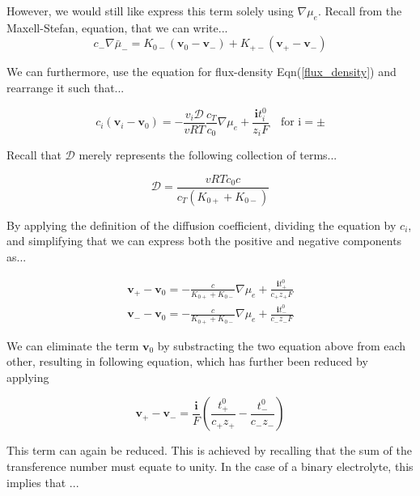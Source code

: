 \documentclass[lettersize,journal]{IEEEtran}
\begin{document}
\noindent However, we would still like express this term solely using $\nabla \mu_{e}$. Recall from the Maxell-Stefan, equation, that we can write...
\begin{equation}\label{max_n_stefy}
c_{-} \nabla \bar{\mu}_{-}=K_{0-}\left(\mathbf{v}_{0}-\mathbf{v}_{-}\right)+K_{+-}\left(\mathbf{v}_{+}-\mathbf{v}_{-}\right)
\end{equation}

We can furthermore, use the equation for flux-density Eqn(\ref{flux_density}) and rearrange it such that...

\begin{equation}\label{flux_density}
c_{i}\left(\mathbf{v}_{i}-\mathbf{v}_{0}\right) =-\frac{v_{i} \mathscr{D}}{v R T} \frac{c_{T}}{c_{0}} \nabla \mu_{e}+\frac{\mathbf{i} t_{i}^{0}}{z_{i} F} \quad \text{for i} = \pm
\end{equation}

\noindent Recall that $\mathscr{D}$ merely represents the following collection of terms...

\begin{equation}
\mathscr{D}=\frac{v R T c_{0} c}{c_{T}\left(K_{0+}+K_{0-}\right)}
\end{equation}

\noindent By applying the definition of the diffusion coefficient, dividing the equation by $c_i$, and simplifying that we can express both the positive and negative components as...

\begin{equation}\label{rel_v_pos_n_neg}
\begin{array}{l}
\mathbf{v}_{+}-\mathbf{v}_{0}=-\frac{c}{K_{0+}+K_{0-}} \nabla \mu_{e}+\frac{\mathbf{i} t_{+}^{0}}{c_{+} z_{+} F} \\
\mathbf{v}_{-}-\mathbf{v}_{0}=-\frac{c}{K_{0+}+K_{0-}} \nabla \mu_{e}+\frac{\mathbf{i} t_{-}^{0}}{c_{-} z_{-} F}
\end{array}
\end{equation}

\noindent We can eliminate the term $\mathbf{v}_0$ by substracting the two equation above from each other, resulting in following equation, which has further been reduced by applying

\begin{equation}
\mathbf{v}_{+}-\mathbf{v}_{-} =\frac{\mathbf{i}}{F}\left(\frac{t_{+}^{0}}{c_{+} z_{+}}-\frac{t_{-}^{0}}{c_{-} z_{-}}\right)
\end{equation}


\noindent This term can again be reduced. This is achieved by recalling that the sum of the transference number must equate to unity. In the case of a binary electrolyte, this implies that ...
\end{document}
